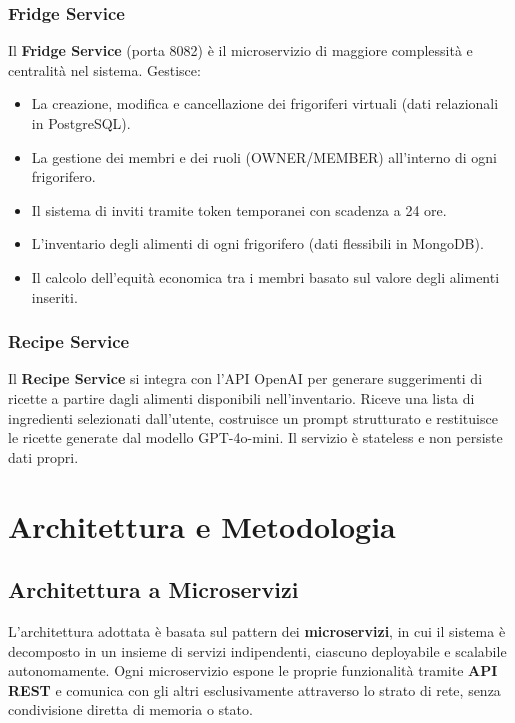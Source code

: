 \documentclass[12pt,a4paper,twoside]{report}
\begin{document}
\subsection{Fridge Service}

Il \textbf{Fridge Service} (porta 8082) è il microservizio di maggiore complessità e centralità nel sistema. Gestisce:
\begin{itemize}
  \item La creazione, modifica e cancellazione dei frigoriferi virtuali (dati relazionali in PostgreSQL).
  \item La gestione dei membri e dei ruoli (OWNER/MEMBER) all'interno di ogni frigorifero.
  \item Il sistema di inviti tramite token temporanei con scadenza a 24 ore.
  \item L'inventario degli alimenti di ogni frigorifero (dati flessibili in MongoDB).
  \item Il calcolo dell'equità economica tra i membri basato sul valore degli alimenti inseriti.
\end{itemize}

\subsection{Recipe Service}

Il \textbf{Recipe Service} si integra con l'API OpenAI per generare suggerimenti di ricette a partire dagli alimenti disponibili nell'inventario. Riceve una lista di ingredienti selezionati dall'utente, costruisce un prompt strutturato e restituisce le ricette generate dal modello GPT-4o-mini. Il servizio è stateless e non persiste dati propri.

\chapter{Architettura e Metodologia}

\section{Architettura a Microservizi}

L'architettura adottata è basata sul pattern dei \textbf{microservizi}, in cui il sistema è decomposto in un insieme di servizi indipendenti, ciascuno deployabile e scalabile autonomamente. Ogni microservizio espone le proprie funzionalità tramite \textbf{API REST} e comunica con gli altri esclusivamente attraverso lo strato di rete, senza condivisione diretta di memoria o stato.
\end{document}
